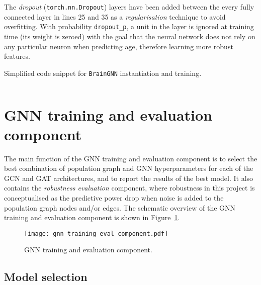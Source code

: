 The \textit{dropout} (\texttt{torch.nn.Dropout}) layers have been added between the every fully connected layer in lines 25 and 35 as a \textit{regularisation} technique to avoid overfitting. With probability \texttt{dropout\_p}, a unit in the layer is ignored at training time (its weight is zeroed) with the goal that the neural network does not rely on any particular neuron when predicting age, therefore learning more robust features.


\begin{listing}
    \caption{Simplified code snippet for \texttt{BrainGNN} instantiation and training.}
    \label{listing:braingnn}
    \medskip
    \inputminted[frame=lines, linenos, breaklines=true, numberblanklines=false, style=colorful]{python}{code/brain_gnn_snippet.py}
    \end{listing}

\section{GNN training and evaluation component}
\label{section:gnn-train-evaluate}

The main function of the GNN training and evaluation component is to select the best combination of population graph and GNN hyperparameters for each of the GCN and GAT architectures, and to report the results of the best model. It also contains the \textit{robustness evaluation} component, where robustness in this project is conceptualised as the predictive power drop when noise is added to the population graph nodes and/or edges. The schematic overview of the GNN training and evaluation component is shown in Figure~\ref{gnn-training-eval-component}.

\begin{figure}[h]
    \centering
    \texttt{[image: gnn\_training\_eval\_component.pdf]}
    \caption{GNN training and evaluation component.}\label{gnn-training-eval-component}
\end{figure}

\subsection{Model selection}

